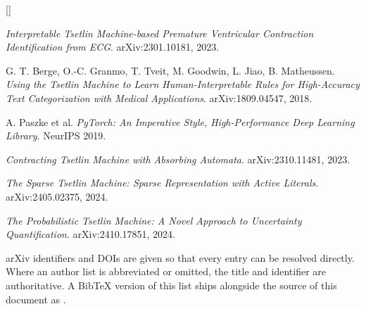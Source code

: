 {\begin{list}{\textcolor{ttorange}{[]}}
\item \emph{Interpretable Tsetlin Machine-based Premature Ventricular Contraction
  Identification from ECG}. arXiv:2301.10181, 2023.

\item G. T. Berge, O.-C. Granmo, T. Tveit, M. Goodwin, L. Jiao, B. Matheussen. \emph{Using the
  Tsetlin Machine to Learn Human-Interpretable Rules for High-Accuracy Text Categorization
  with Medical Applications}. arXiv:1809.04547, 2018.

\item A. Paszke et al. \emph{PyTorch: An Imperative Style, High-Performance Deep Learning
  Library}. NeurIPS 2019.

\item \emph{Contracting Tsetlin Machine with Absorbing Automata}. arXiv:2310.11481, 2023.

\item \emph{The Sparse Tsetlin Machine: Sparse Representation with Active Literals}.
  arXiv:2405.02375, 2024.

\item \emph{The Probabilistic Tsetlin Machine: A Novel Approach to Uncertainty
  Quantification}. arXiv:2410.17851, 2024.

\end{list}

\vspace{0.4em}
{\footnotesize\color{ttgray}
arXiv identifiers and DOIs are given so that every entry can be resolved directly. Where an
author list is abbreviated or omitted, the title and identifier are authoritative.
A BibTeX version of this list ships alongside the source of this document as
.}
}
